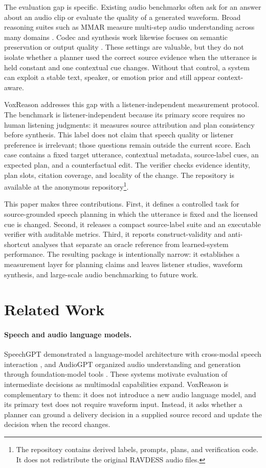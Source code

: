 \documentclass{article}
\newcommand{\repo}{the anonymous repository}
\begin{document}
The evaluation gap is specific. Existing audio benchmarks often ask for an answer about an audio clip or evaluate the quality of a generated waveform. Broad reasoning suites such as MMAR measure multi-step audio understanding across many domains \cite{mmar}. Codec and synthesis work likewise focuses on semantic preservation or output quality \cite{codec}. These settings are valuable, but they do not isolate whether a planner used the correct source evidence when the utterance is held constant and one contextual cue changes. Without that control, a system can exploit a stable text, speaker, or emotion prior and still appear context-aware.

VoxReason addresses this gap with a listener-independent measurement protocol. The benchmark is listener-independent because its primary score requires no human listening judgments: it measures source attribution and plan consistency before synthesis. This label does not claim that speech quality or listener preference is irrelevant; those questions remain outside the current score. Each case contains a fixed target utterance, contextual metadata, source-label cues, an expected plan, and a counterfactual edit. The verifier checks evidence identity, plan slots, citation coverage, and locality of the change. The repository is available at \repo\footnote{The repository contains derived labels, prompts, plans, and verification code. It does not redistribute the original RAVDESS audio files.}.

This paper makes three contributions. First, it defines a controlled task for source-grounded speech planning in which the utterance is fixed and the licensed cue is changed. Second, it releases a compact source-label suite and an executable verifier with auditable metrics. Third, it reports construct-validity and anti-shortcut analyses that separate an oracle reference from learned-system performance. The resulting package is intentionally narrow: it establishes a measurement layer for planning claims and leaves listener studies, waveform synthesis, and large-scale audio benchmarking to future work.

\section{Related Work}

\paragraph{Speech and audio language models.}
SpeechGPT demonstrated a language-model architecture with cross-modal speech interaction \cite{speechgpt}, and AudioGPT organized audio understanding and generation through foundation-model tools \cite{audiogpt}. These systems motivate evaluation of intermediate decisions as multimodal capabilities expand. VoxReason is complementary to them: it does not introduce a new audio language model, and its primary test does not require waveform input. Instead, it asks whether a planner can ground a delivery decision in a supplied source record and update the decision when the record changes.
\end{document}
